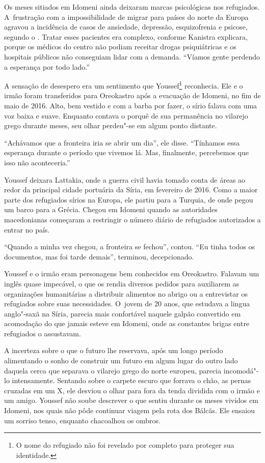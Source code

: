 Os meses sitiados em Idomeni ainda deixaram marcas psicológicas nos
refugiados. A~frustração com a impossibilidade de migrar para países do
norte da Europa agravou a incidência de casos de ansiedade, depressão,
esquizofrenia e psicose, segundo o . Tratar esses pacientes era
complexo, conforme Kanistra explicara, porque os médicos do centro não podiam receitar drogas psiquiátricas e os hospitais públicos não conseguiam lidar com a
demanda. ``Víamos gente perdendo a esperança por todo lado.''

A sensação de desespero era um sentimento que Youssef\footnote{ O nome do refugiado não foi revelado por completo
para proteger sua identidade.} 
reconhecia. Ele e o irmão foram transferidos para Oreokastro após a
evacuação de Idomeni, no fim de maio de 2016. Alto, bem vestido e com a
barba por fazer, o sírio falava com uma voz baixa e suave. Enquanto
contava o porquê de sua permanência no vilarejo grego durante meses, seu olhar
perdeu"-se em algum ponto distante.

``Achávamos que a fronteira iria se abrir um dia'', ele disse. ``Tínhamos
essa esperança durante o período que vivemos lá. Mas,
finalmente, percebemos que isso não aconteceria.''

Youssef deixara Lattakia, onde a guerra civil havia tomado conta de
áreas ao redor da principal cidade portuária da Síria, em fevereiro de
2016. Como a maior parte dos refugiados sírios na Europa, ele partiu para a
Turquia, de onde pegou um barco para a Grécia. Chegou em Idomeni quando
as autoridades macedonianas começaram a restringir o número diário de
refugiados autorizados a entrar no país.

``Quando a minha vez chegou, a fronteira se fechou'', contou. ``Eu
tinha todos os documentos, mas foi tarde demais'', terminou, decepcionado.

Youssef e o irmão eram personagens bem conhecidos em Oreokastro. Falavam
um inglês quase impecável, o que os rendia diversos pedidos para
auxiliarem as organizações humanitárias a distribuir alimentos no
abrigo ou a entrevistar os refugiados sobre suas necessidades. O~jovem
de 20 anos, que estudava a lingua anglo"-saxã na Síria, parecia mais
confortável naquele galpão convertido em acomodação do que jamais esteve
em Idomeni, onde as constantes brigas entre refugiados o assustavam.

A incerteza sobre o que o futuro lhe reservava, após um longo período
alimentando o sonho de construir um futuro em algum lugar do outro lado
daquela cerca que separava o vilarejo grego do norte europeu, parecia
incomodá"-lo intensamente. Sentando sobre o carpete escuro que forrava o
chão, as pernas cruzadas em um X, ele desviou o olhar para fora da tenda
dividida com o irmão e um amigo.  Youssef não soube
descrever o que sentiu durante os meses vividos em Idomeni, nos quais
não pôde continuar viagem pela rota dos Bálcãs. Ele ensaiou um sorriso
tenso, enquanto chacoalhou os ombros.

